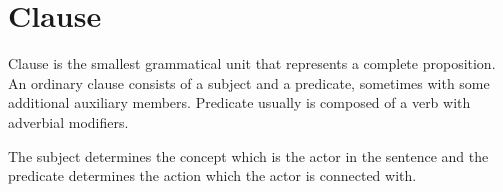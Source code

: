 \section{Clause}

Clause is the smallest grammatical unit that represents a complete proposition. An ordinary clause consists of a subject and a predicate, sometimes with some additional auxiliary members. Predicate usually is composed of a verb with adverbial modifiers.

The subject determines the concept which is the actor in the sentence and the predicate determines the action which the actor is connected with.

